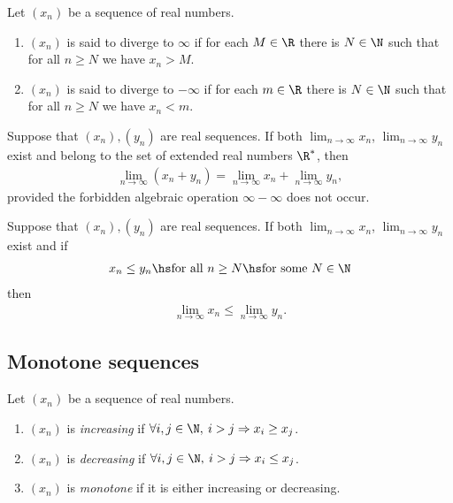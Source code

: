 \documentclass{article}
\begin{document}
\setcounter{theorem}{5}
\begin{definition}
	Let $(x_n)$ be a sequence of real numbers.
	\begin{enumerate}
		\item $(x_n)$ is said to diverge to $\infty$ if for each $M\in\R$ there is $N\in\N$ such that
		      for all $n\geq N$ we have $x_n>M$.
		\item $(x_n)$ is said to diverge to $-\infty$ if for each $m\in\R$ there is $N\in\N$ such that
		      for all $n\geq N$ we have $x_n<m$.
	\end{enumerate}
\end{definition}

\begin{theorem}
	Suppose that $(x_n), (y_n)$ are real sequences. If both $\lim_{n\to\infty}x_n$, $\lim_{n\to\infty}y_n$
	exist and belong to the set of extended real numbers $\R^*$, then
	\begin{align*}
		\lim_{n\to\infty}(x_n+y_n)=\lim_{n\to\infty}x_n+\lim_{n\to\infty}y_n,
	\end{align*}
	provided the forbidden algebraic operation $\infty-\infty$ does not occur.
\end{theorem}

\begin{theorem}
	Suppose that $(x_n),(y_n)$ are real sequences. If both $\lim_{n\to\infty}x_n$, $\lim_{n\to\infty}y_n$
	exist and if
	\begin{align*}
		x_n\leq y_n \hs \text{for all } n\geq N \hs \text{for some }N\in\N
	\end{align*}
	then
	\begin{align*}
		\lim_{n\to\infty}x_n\leq \lim_{n\to\infty}y_n.
	\end{align*}
\end{theorem}

\subsection{Monotone sequences}

\begin{definition}
	Let $(x_n)$ be a sequence of real numbers.
	\begin{enumerate}
		\item $(x_n)$ is \emph{increasing} if $\forall i,j\in\N,\: i>j \Rightarrow x_i \geq x_j$.
		\item $(x_n)$ is \emph{decreasing} if $\forall i,j\in\N,\: i>j \Rightarrow x_i \leq x_j$.
		\item $(x_n)$ is \emph{monotone} if it is either increasing or decreasing.
	\end{enumerate}
\end{definition}
\end{document}
